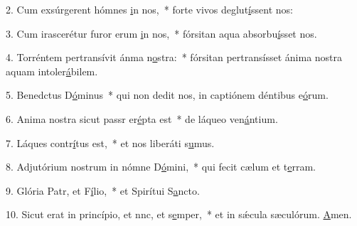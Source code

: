 2. Cum exsúrgerent hómnes \uline{i}n nos,~* forte vivos deglut\uline{í}ssent nos:\par 
3. Cum irascerétur furor erum \uline{i}n nos,~* fórsitan aqua absorbu\uline{í}sset nos.\par 
4. Torréntem pertransívit ánma n\uline{o}stra:~* fórsitan pertransísset ánima nostra aquam intoler\uline{á}bilem.\par 
5. Benedctus D\uline{ó}minus~* qui non dedit nos, in captiónem déntibus e\uline{ó}rum.\par 
6. Anima nostra sicut passr er\uline{é}pta est~* de láqueo ven\uline{á}ntium.\par 
7. Láques contr\uline{í}tus est,~* et nos liberáti s\uline{u}mus.\par 
8. Adjutórium nostrum in nómne D\uline{ó}mini,~* qui fecit cælum et t\uline{e}rram.\par 
9. Glória Patr, et F\uline{í}lio,~* et Spirítui S\uline{a}ncto.\par 
10. Sicut erat in princípio, et nnc, et s\uline{e}mper,~* et in sǽcula sæculórum. \uline{A}men.\par 
